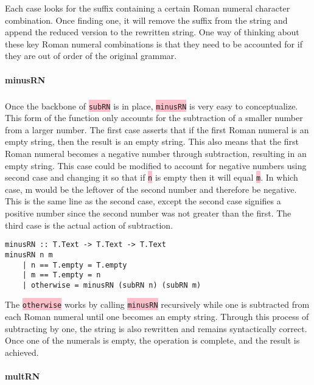 \documentclass{article}
\begin{document}
Each case looks for the suffix containing a certain Roman numeral character combination. Once finding one, it will remove the suffix from the string and append the reduced version to the rewritten string. One way of thinking about these key Roman numeral combinations is that they need to be accounted for if they are out of order of the original grammar.

\paragraph{minusRN}

\subparagraph{}

Once the backbone of \colorbox{pink}{\lstinline{subRN}} is in place, \colorbox{pink}{\lstinline{minusRN}} is very easy to conceptualize. This form of the function only accounts for the subtraction of a smaller number from a larger number. The first case asserts that if the first Roman numeral is an empty string, then the result is an empty string. This also means that the first Roman numeral becomes a negative number through subtraction, resulting in an empty string. This case could be modified to account for negative numbers using second case and changing it so that if \colorbox{pink}{\lstinline{n}} is empty then it will equal \colorbox{pink}{\lstinline{m}}. In which case, m would be the leftover of the second number and therefore be negative. This is the same line as the second case, except the second case signifies a positive number since the second number was not greater than the first. The third case is the actual action of subtraction. 

\begin{lstlisting}
minusRN :: T.Text -> T.Text -> T.Text
minusRN n m
    | n == T.empty = T.empty
    | m == T.empty = n
    | otherwise = minusRN (subRN n) (subRN m)
\end{lstlisting}

The \colorbox{pink}{\lstinline{otherwise}} works by calling \colorbox{pink}{\lstinline{minusRN}} recursively while one is subtracted from each Roman numeral until one becomes an empty string. Through this process of subtracting by one, the string is also rewritten and remains syntactically correct. Once one of the numerals is empty, the operation is complete, and the result is achieved.

\paragraph{multRN}
\end{document}

